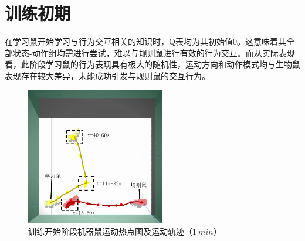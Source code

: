 \section{训练初期}
在学习鼠开始学习与行为交互相关的知识时，Q表均为其初始值0。这意味着其全部状态-动作组均需进行尝试，难以与规则鼠进行有效的行为交互。而从实际表现看，此阶段学习鼠的行为表现具有极大的随机性，运动方向和动作模式均与生物鼠表现存在较大差异，未能成功引发与规则鼠的交互行为。
\begin{figure}[htbp]
  \vspace{13pt}
  \centering
  \includegraphics[height=6cm]{images/ch05/start/robotic/robotic.png}
  \caption{训练开始阶段机器鼠运动热点图及运动轨迹（$1~min$）}\label{figure_roboticheatmap}
\end{figure}

